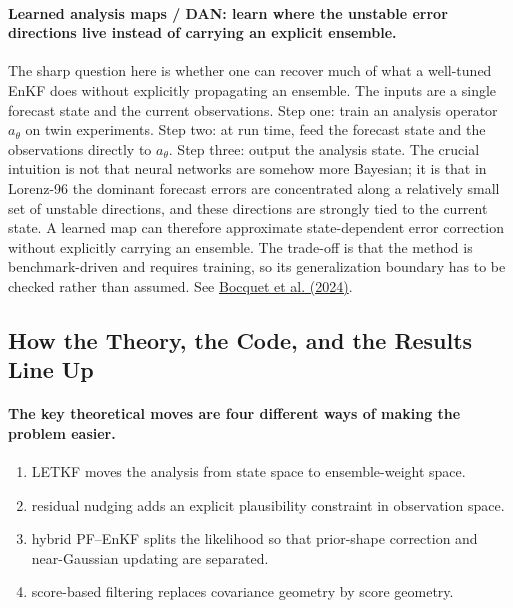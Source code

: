 \documentclass[12pt,a4paper]{article}
\begin{document}
\paragraph{Learned analysis maps / DAN: learn where the unstable error directions live instead of carrying an explicit ensemble.}
The sharp question here is whether one can recover much of what a well-tuned EnKF does without explicitly propagating an ensemble. The inputs are a single forecast state and the current observations. Step one: train an analysis operator \(a_\theta\) on twin experiments. Step two: at run time, feed the forecast state and the observations directly to \(a_\theta\). Step three: output the analysis state. The crucial intuition is not that neural networks are somehow more Bayesian; it is that in Lorenz-96 the dominant forecast errors are concentrated along a relatively small set of unstable directions, and these directions are strongly tied to the current state. A learned map can therefore approximate state-dependent error correction without explicitly carrying an ensemble. The trade-off is that the method is benchmark-driven and requires training, so its generalization boundary has to be checked rather than assumed. See \href{https://arxiv.org/abs/2408.04739}{Bocquet et al. (2024)}.

\subsection{How the Theory, the Code, and the Results Line Up}

\paragraph{The key theoretical moves are four different ways of making the problem easier.}
\begin{enumerate}
  \item LETKF moves the analysis from state space to ensemble-weight space.
  \item residual nudging adds an explicit plausibility constraint in observation space.
  \item hybrid PF--EnKF splits the likelihood so that prior-shape correction and near-Gaussian updating are separated.
  \item score-based filtering replaces covariance geometry by score geometry.
\end{enumerate}
\end{document}
